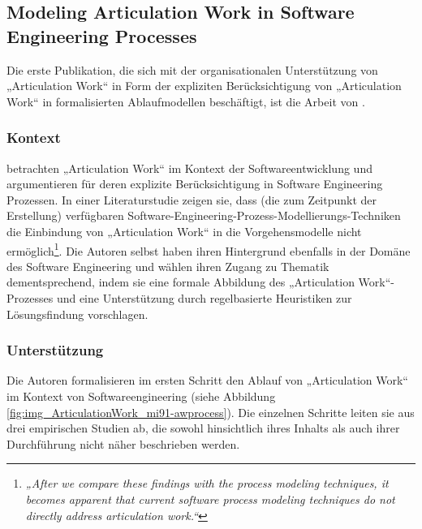 
\subsection{Modeling Articulation Work in Software Engineering Processes} %
\label{sub:modeling_articulation_work_in_software_engineering_processes}

Die erste Publikation, die sich mit der organisationalen Unterstützung von „Articulation Work“ in Form der expliziten Berücksichtigung von „Articulation Work“ in formalisierten Ablaufmodellen beschäftigt, ist die Arbeit von \citet{Mi91}.

\subsubsection{Kontext}

\citet{Mi91} betrachten „Articulation Work“ im Kontext der Softwareentwicklung und argumentieren für deren explizite Berücksichtigung in Software Engineering Prozessen. In einer Literaturstudie zeigen sie, dass (die zum Zeitpunkt der Erstellung) verfügbaren Software-Engineering-Prozess-Modellierungs-Techniken die Einbindung von „Articulation Work“ in die Vorgehensmodelle nicht ermöglich\footnote{\emph{„After we compare these findings with the process modeling techniques, it becomes apparent that current software process modeling techniques do not directly address articulation work.“}\citep[][S. 192]{Mi91}}. Die Autoren selbst haben ihren Hintergrund ebenfalls in der Domäne des Software Engineering und wählen ihren Zugang zu Thematik dementsprechend, indem sie eine formale Abbildung des „Articulation Work“-Prozesses und eine Unterstützung durch regelbasierte Heuristiken zur Lösungsfindung vorschlagen.

\subsubsection{Unterstützung}

Die Autoren formalisieren im ersten Schritt den Ablauf von „Articulation Work“ im Kontext von Softwareengineering (siehe Abbildung \ref{fig:img_ArticulationWork_mi91-awprocess}). Die einzelnen Schritte leiten sie aus drei empirischen Studien ab, die sowohl hinsichtlich ihres Inhalts als auch ihrer Durchführung nicht näher beschrieben werden.

